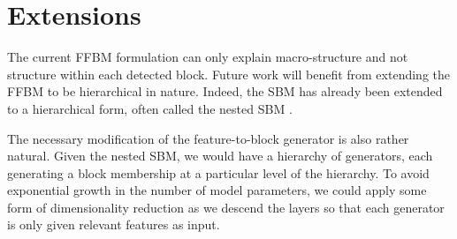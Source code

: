 \section{Extensions}

The current FFBM formulation can only explain macro-structure and not structure within each detected block. Future work will benefit from extending the FFBM to be hierarchical in nature. Indeed, the SBM has already been extended to a hierarchical form, often called the nested SBM \cite{SBM-hierarchical}.

The necessary modification of the feature-to-block generator is also rather natural. Given the nested SBM, we would have a hierarchy of generators, each generating a block membership at a particular level of the hierarchy. To avoid exponential growth in the number of model parameters, we could apply some form of dimensionality reduction as we descend the layers so that each generator is only given relevant features as input.